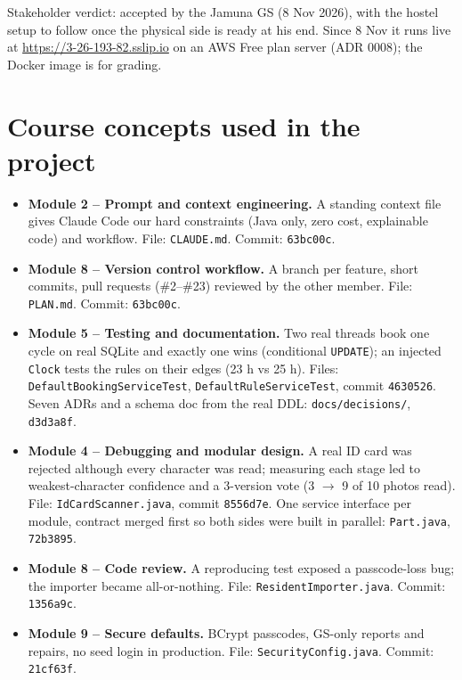 \documentclass[11pt,a4paper]{article}
\begin{document}
Stakeholder verdict: accepted by the Jamuna GS (8 Nov 2026), with the hostel setup to follow once the physical side is ready at his end. Since 8 Nov it runs live at \url{https://3-26-193-82.sslip.io} on an AWS Free plan server (ADR 0008); the Docker image is for grading.

\section{Course concepts used in the project}

\begin{itemize}[leftmargin=*,nosep]
  \item \textbf{Module 2 -- Prompt and context engineering.} A standing context file gives Claude Code our hard constraints (Java only, zero cost, explainable code) and workflow. File: \texttt{CLAUDE.md}. Commit: \texttt{63bc00c}.
  \item \textbf{Module 8 -- Version control workflow.} A branch per feature, short commits, pull requests (\#2--\#23) reviewed by the other member. File: \texttt{PLAN.md}. Commit: \texttt{63bc00c}.
  \item \textbf{Module 5 -- Testing and documentation.} Two real threads book one cycle on real SQLite and exactly one wins (conditional \texttt{UPDATE}); an injected \texttt{Clock} tests the rules on their edges (23 h vs 25 h). Files: \texttt{DefaultBookingServiceTest}, \texttt{DefaultRuleServiceTest}, commit \texttt{4630526}. Seven ADRs and a schema doc from the real DDL: \texttt{docs/decisions/}, \texttt{d3d3a8f}.
  \item \textbf{Module 4 -- Debugging and modular design.} A real ID card was rejected although every character was read; measuring each stage led to weakest-character confidence and a 3-version vote (3 $\to$ 9 of 10 photos read). File: \texttt{IdCardScanner.java}, commit \texttt{8556d7e}. One service interface per module, contract merged first so both sides were built in parallel: \texttt{Part.java}, \texttt{72b3895}.
  \item \textbf{Module 8 -- Code review.} A reproducing test exposed a passcode-loss bug; the importer became all-or-nothing. File: \texttt{ResidentImporter.java}. Commit: \texttt{1356a9c}.
  \item \textbf{Module 9 -- Secure defaults.} BCrypt passcodes, GS-only reports and repairs, no seed login in production. File: \texttt{SecurityConfig.java}. Commit: \texttt{21cf63f}.
\end{itemize}
\end{document}
